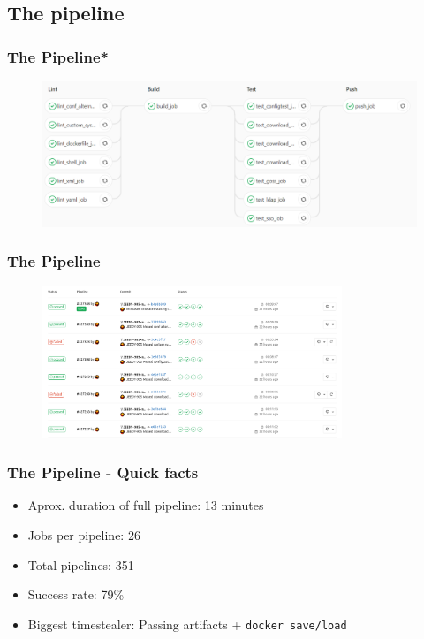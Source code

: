 \documentclass[14pt,aspectratio=169]{beamer}
\begin{document}
\subsection{The pipeline}

\begin{frame}
  \frametitle{The Pipeline*}
  \begin{figure}
    \includegraphics[width=\textwidth]{images/pipeline_2.png}
  \end{figure}
\end{frame}

\begin{frame}
  \frametitle{The Pipeline}
  \begin{figure}
    \includegraphics[width=0.8\textwidth]{images/pipeline_list.png}
  \end{figure}
\end{frame}

\begin{frame}
  \frametitle{The Pipeline - Quick facts}
  \begin{itemize}
    \item Aprox. duration of full pipeline: 13 minutes
    \item Jobs per pipeline: 26
    \item Total pipelines: 351
    \item Success rate: 79\%
    \item Biggest timestealer: Passing artifacts + \texttt{docker save/load}
  \end{itemize}
\end{frame}
\end{document}
